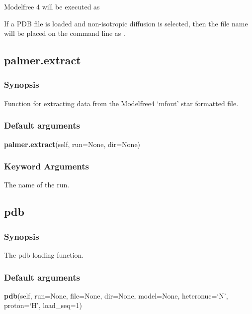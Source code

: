 Modelfree 4 will be executed as
    


If a PDB file is loaded and non-isotropic diffusion is selected, then the file name will be
placed on the command line as 
.


\newpage

\subsection{palmer.extract}


\subsubsection{Synopsis}

Function for extracting data from the Modelfree4 `mfout' star formatted file.

\subsubsection{Default arguments}

\textsf{\textbf{palmer.extract}(self, run=None, dir=None)}


\subsubsection{Keyword Arguments}

  The name of the run.


\newpage

\subsection{pdb}


\subsubsection{Synopsis}

The pdb loading function.

\subsubsection{Default arguments}

\textsf{\textbf{pdb}(self, run=None, file=None, dir=None, model=None, heteronuc=`N', proton=`H', load\_seq=1)}


